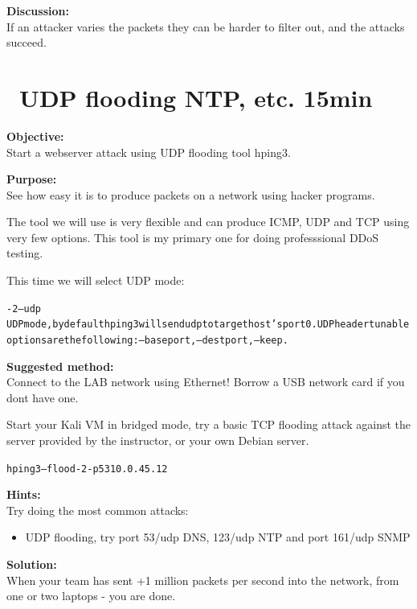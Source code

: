 \documentclass[a4paper,11pt,notitlepage]{report}
\begin{document}
{\bf Discussion:}\\
If an attacker varies the packets they can be harder to filter out, and the attacks succeed.

\chapter{\faInfoCircle\ UDP flooding NTP, etc. 15min}


{\bf Objective:}\\
Start a webserver attack using UDP flooding tool hping3.

{\bf Purpose:}\\
See how easy it is to produce packets on a network using hacker programs.

The tool we will use is very flexible and can produce ICMP, UDP and TCP using very few options. This tool is my primary one for doing professsional DDoS testing.

This time we will select UDP mode:

\begin{alltt}\footnotesize
-2 --udp
       UDP mode, by default hping3 will send udp to target host's port 0.  UDP header  tunable
       options are the following: --baseport, --destport, --keep.
\end{alltt}

{\bf Suggested method:}\\
Connect to the LAB network using Ethernet! Borrow a USB network card if you dont have one.

Start your Kali VM in bridged mode, try a basic TCP flooding attack against the server provided by the instructor, or your own Debian server.

\begin{alltt}\footnotesize
hping3 --flood -2 -p 53 10.0.45.12
\end{alltt}



{\bf Hints:}\\

Try doing the most common attacks:
\begin{itemize}
\item UDP flooding, try port 53/udp DNS, 123/udp NTP and port 161/udp SNMP
\end{itemize}

{\bf Solution:}\\
When your team has sent +1 million packets per second into the network, from one or two laptops - you are done.
\end{document}
